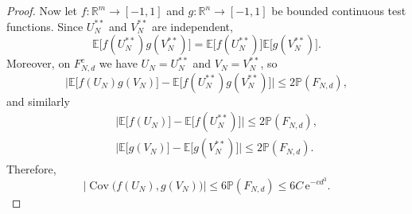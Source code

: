 \documentclass[12pt, reqno]{amsart}
\numberwithin{equation}{section}
\theoremstyle{definition}
\newcommand{\R}{\mathbb{R}}
\newcommand{\E}{\mathbb{E}}
\newcommand{\Cov}{\operatorname{Cov}}
\newcommand{\Prob}{\mathbb{P}}
\newcommand{\e}{\,\mathrm{e}}
\begin{document}
\begin{proof}
  Now let $f:\R^m\to[-1,1]$ and $g:\R^n\to[-1,1]$ be bounded continuous test
  functions.  Since $U_N^{**}$ and $V_N^{**}$ are independent,
  \[
    \E\bigl[f(U_N^{**})g(V_N^{**})\bigr]
    =
    \E\bigl[f(U_N^{**})\bigr]\E\bigl[g(V_N^{**})\bigr].
  \]
  Moreover, on $F_{N,d}^c$ we have $U_N=U_N^{**}$ and $V_N=V_N^{**}$, so
  \[
    \bigl|\E\bigl[f(U_N)g(V_N)\bigr]-\E\bigl[f(U_N^{**})g(V_N^{**})\bigr]\bigr|
    \le 2\Prob(F_{N,d}),
  \]
  and similarly
  \begin{align*}
    &\bigl|\E\bigl[f(U_N)\bigr]-\E\bigl[f(U_N^{**})\bigr]\bigr|
    \le 2\Prob(F_{N,d}),\\
    \quad
   & \bigl|\E\bigl[g(V_N)\bigr]-\E\bigl[g(V_N^{**})\bigr]\bigr|
    \le 2\Prob(F_{N,d}).
  \end{align*}
  Therefore,
  \[
    \bigl|\Cov\bigl(f(U_N),g(V_N)\bigr)\bigr|
    \le 6\Prob(F_{N,d})
    \le 6C \e^{-c d^3}.
  \]


\end{proof}
\end{document}
